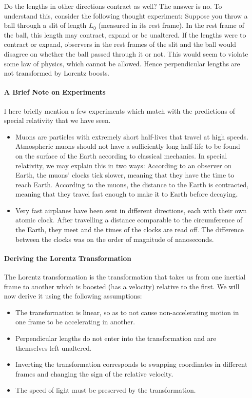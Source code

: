 Do the lengths in other directions contract as well? The answer is no. To understand this, consider the following thought experiment: Suppose you throw a ball through a slit of length $L_{0}$ (measured in its rest frame). In the rest frame of the ball, this length may contract, expand or be unaltered. If the lengths were to contract or expand, observers in the rest frames of the slit and the ball would disagree on whether the ball passed through it or not. This would seem to violate some law of physics, which cannot be allowed. Hence perpendicular lengths are not transformed by Lorentz boosts.

\paragraph{A Brief Note on Experiments}
I here briefly mention a few experiments which match with the predictions of special relativity that we have seen.
\begin{itemize}
	\item Muons are particles with extremely short half-lives that travel at high speeds. Atmospheric muons should not have a sufficiently long half-life to be found on the surface of the Earth according to classical mechanics. In special relativity, we may explain this in two ways: According to an observer on Earth, the muons' clocks tick slower, meaning that they have the time to reach Earth. According to the muons, the distance to the Earth is contracted, meaning that they travel fast enough to make it to Earth before decaying.
	\item Very fast airplanes have been sent in different directions, each with their own atomic clock. After travelling a distance comparable to the circumference of the Earth, they meet and the times of the clocks are read off. The difference between the clocks was on the order of magnitude of nanoseconds.
\end{itemize}

\paragraph{Deriving the Lorentz Transformation}
The Lorentz transformation is the transformation that takes us from one inertial frame to another which is boosted (has a velocity) relative to the first. We will now derive it using the following assumptions:
\begin{itemize}
	\item The transformation is linear, so as to not cause non-accelerating motion in one frame to be accelerating in another.
	\item Perpendicular lengths do not enter into the transformation and are themselves left unaltered.
	\item Inverting the transformation corresponds to swapping coordinates in different frames and changing the sign of the relative velocity.
	\item The speed of light must be preserved by the transformation.
\end{itemize}

